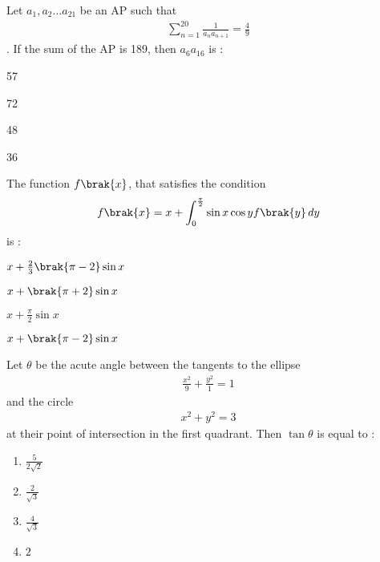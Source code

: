     \item Let $a_1, a_2 \dots a_{21}$ be an AP such that 
        \begin{align}
            \sum_{n = 1} ^{20} \frac{1}{a_{n}a_{n+1}} = \frac{4}{9}
        \end{align}. If the sum of the AP is 189, then $a_{6}a_{16}$ is : 
        \hfill{}
        \begin{enumerate}
                \begin{multicols}{2}
                \item 57 \columnbreak
                \item 72
                \end{multicols}
                \begin{multicols}{2}
                \item 48 \columnbreak
                \item 36
                \end{multicols}
        \end{enumerate}

    \item  The function $f\brak{x}$, that satisfies the condition  
        \begin{align}
            f\brak{x} = x + \int_{0} ^ {\frac{\pi}{2}} \sin x \cos y f\brak{y} \, dy
        \end{align} 
        is : 
        \hfill{}
        \begin{enumerate}
                \begin{multicols}{4}
                \item $x + \frac{2}{3}\brak{\pi - 2}\sin x$ \columnbreak
                \item $x + \brak{\pi + 2}\sin x$ \columnbreak
                \item $x + \frac{\pi}{2}\sin x$ \columnbreak
                \item $x + \brak{\pi - 2}\sin x$
                \end{multicols}
        \end{enumerate}

    \item Let $\theta$ be the acute angle between the tangents to the ellipse 
        \begin{align}
            \frac{x^2}{9} + \frac{y^2}{1} = 1
        \end{align} and the circle 
        \begin{align}
            x^2 + y^2 = 3
        \end{align} at their point of intersection in the first quadrant. Then $\tan \theta$ is equal to :

        \hfill{}
        \begin{enumerate}
            \item $\frac{5}{2\sqrt{2}}$ 
            \item $\frac{2}{\sqrt{3}}$ 
            \item $\frac{4}{\sqrt{3}}$  
            \item $2$
        \end{enumerate}
